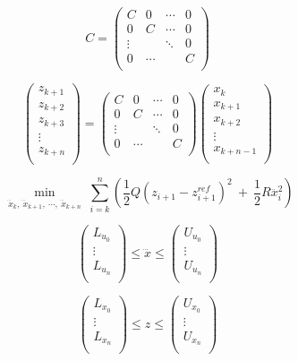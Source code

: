 \begin{equation}
     C=\left(\begin{matrix}C&0&\cdots&0\\0&C&\cdots&0\\\vdots&&\ddots&0\\0&\cdots&&C\\\end{matrix}\right)
\end{equation}

\begin{equation}
     \left(\begin{matrix}z_{k+1}\\z_{k+2}\\z_{k+3}\\\vdots\\z_{k+n}\\\end{matrix}\right)=\left(\begin{matrix}C&0&\cdots&0\\0&C&\cdots&0\\\vdots&&\ddots&0\\0&\cdots&&C\\\end{matrix}\right)\left(\begin{matrix}x_k\\x_{k+1}\\x_{k+2}\\\vdots\\x_{k+n-1}\\\end{matrix}\right)
\end{equation}

\begin{equation}
     \min_{\substack{{\dddot{x}}_k,\ {\dddot{x}}_{k+1},\ \cdots,\ {\dddot{x}}_{k+n}}} \sum_{i=k}^{n}\left(\frac{1}{2}Q\left(z_{i+1}-z_{i+1}^{ref}\right)^2\ +\ \frac{1}{2}R{\dddot{x}}_i^2\right)
\end{equation}

\begin{equation}
     \left(\begin{matrix}L_{u_0}\\\vdots\\L_{u_n}\\\end{matrix}\right)\le\dddot{x}\le\left(\begin{matrix}U_{u_0}\\\vdots\\U_{u_n}\\\end{matrix}\right)
\end{equation}

\begin{equation}
     \left(\begin{matrix}L_{x_0}\\\vdots\\L_{x_n}\\\end{matrix}\right)\le z\le\left(\begin{matrix}U_{x_0}\\\vdots\\U_{x_n}\\\end{matrix}\right)
\end{equation}

\newpage